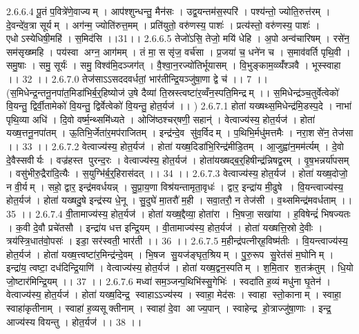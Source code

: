 2.6.6.4
पू॒तं प॒वित्रे॑णे॒वाज्यम् । आप॑श्शुन्धन्तु॒ मैन॑सः । उद्व॒यन्तम॑स॒स्परि॑ । पश्य॑न्तो॒ ज्योति॒रुत्त॑रम् । दे॒वन्दे॑व॒त्रा सूर्यम् । अग॑न्म॒ ज्योति॑रुत्त॒मम् । प्रति॑युतो॒ वरु॑णस्य॒ पाशः॑ । प्रत्य॑स्तो॒ वरु॑णस्य॒ पाशः॑ । एधोऽस्येधिषी॒महि॑ । स॒मिद॑सि ।।31।।
2.6.6.5
तेजो॑ऽसि॒ तेजो॒ मयि॑ धेहि । अ॒पो अन्व॑चारिषम् । रसे॑न॒ सम॑सृख्ष्महि । पय॑स्वा अग्न॒ आग॑मम् । तं मा॒ ससृ॑ज॒ वर्च॑सा । प्र॒जया॑ च॒ धने॑न च । स॒माव॑वर्ति पृथि॒वी । समु॒षाः । समु॒ सूर्यः॑ । समु॒ विश्व॑मि॒दञ्जग॑त् । वै॒श्वा॒न॒रज्यो॑तिर्भूयासम् । वि॒भुङ्काम॒व्व्यँ॑श्ञवै । भूस्स्वाहा ।। 32 ।।
2.6.7.0
तेज॑साऽऽसददवर्धतां॒ भार॑तीन्द्रि॒यञ्जु॑षा॒णा द्वे च॑ ।। 7 ।। (स॒मिधेन्द्र॒न्तनू॒नपा॑त॒मिडा॑भिर्ब॒र्॒हिष्योज॑ उ॒षे दैव्या॑ ति॒स्रस्त्वष्टा॑र॒व्वँन॒स्पति॒मिन्द्रम् ।। स॒मिधेन्द्र॑ञ्च॒तुर्वेत्वेको॑ वि॒यन्तु॒ द्विर्वी॒तामेको॑ वि॒यन्तु॒ द्विर्वेत्वेको॑ वि॒यन्तु॒ होत॒र्यज॑ ।। )
2.6.7.1
होता॑ यख्षथ्स॒मिधेन्द्र॑मि॒डस्प॒दे । नाभा॑ पृथि॒व्या अधि॑ । दि॒वो वर्ष्म॒न्थ्समि॑ध्यते । ओजि॑ष्ठश्चर्‌षणी॒ सहान्॑ । वेत्वाज्य॑स्य॒ होत॒र्यज॑ । होता॑ यख्ष॒त्तनू॒नपा॑तम् । ऊ॒तिभि॒र्जेता॑र॒मप॑राजितम् । इन्द्र॑न्दे॒व सु॑व॒र्विदम् । प॒थिभि॒र्मधु॑मत्तमैः । नरा॒शसे॑न॒ तेज॑सा ।। 33 ।।
2.6.7.2
वेत्वाज्य॑स्य॒ होत॒र्यज॑ । होता॑ यख्ष॒दिडा॑भि॒रिन्द्र॑मीडि॒तम् । आ॒जुह्वा॑न॒मम॑र्त्यम् । दे॒वो दे॒वैस्सवीर्यः । वज्र॑हस्त पुरन्द॒रः । वेत्वाज्य॑स्य॒ होत॒र्यज॑ । होता॑यख्षद्ब॒र्॒हिषीन्द्र॑न्निषद्व॒रम् । वृ॒ष॒भन्नर्या॑पसम् । वसु॑भीरु॒द्रैरा॑दि॒त्यैः । स॒युग्भि॑र्ब॒र्॒हिरास॑दत् ।। 34 ।।
2.6.7.3
वेत्वाज्य॑स्य॒ होत॒र्यज॑ । होता॑ यख्ष॒दोजो॒ न वी॒र्यम् । सहो॒ द्वार॒ इन्द्र॑मवर्धयन्न् । सु॒प्रा॒य॒णा विश्र॑यन्तामृता॒वृधः॑ । द्वार॒ इन्द्रा॑य मी॒ढुषे । वि॒यन्त्वाज्य॑स्य॒ होत॒र्यज॑ । होता॑ यख्षदु॒षे इन्द्र॑स्य धे॒नू । सु॒दुघे॑ मा॒तरौ॑ म॒ही । सवा॒तरौ॒ न तेज॑सी । व॒थ्समिन्द्र॑मवर्धताम् ।। 35 ।।
2.6.7.4
वी॒तामाज्य॑स्य॒ होत॒र्यज॑ । होता॑ यख्ष॒द्दैव्या॒ होता॑रा । भि॒षजा॒ सखा॑या । ह॒विषेन्द्रं॑ भिषज्यतः । क॒वी दे॒वौ प्रचे॑तसौ । इन्द्रा॑य धत्त इन्द्रि॒यम् । वी॒तामाज्य॑स्य॒ होत॒र्यज॑ । होता॑ यख्षत्ति॒स्रो दे॒वीः । त्रय॑स्त्रि॒धात॑वो॒पसः॑ । इडा॒ सर॑स्वती॒ भार॑ती ।। 36 ।।
2.6.7.5
म॒हीन्द्र॑पत्नीर्‌ह॒विष्म॑तीः । वि॒यन्त्वाज्य॑स्य॒ होत॒र्यज॑ । होता॑ यख्ष॒त्त्वष्टा॑र॒मिन्द्र॑न्दे॒वम् । भि॒षज॑ सु॒यज॑ङ्घृत॒श्रियम् । पु॒रु॒रूप॑ सु॒रेत॑सं म॒घोनिम् । इन्द्रा॑य॒ त्वष्टा॒ दध॑दिन्द्रि॒याणि॑ । वेत्वाज्य॑स्य॒ होत॒र्यज॑ । होता॑ यख्ष॒द्वन॒स्पतिम् । श॒मि॒तार॑ श॒तक्र॑तुम् । धि॒यो जो॒ष्टार॑मिन्द्रि॒यम् ।। 37 ।।
2.6.7.6
मध्वा॑ सम॒ञ्जन्प॒थिभि॑स्सु॒गेभिः॑ । स्वदा॑ति ह॒व्यं मधु॑ना घृ॒तेन॑ । वेत्वाज्य॑स्य॒ होत॒र्यज॑ । होता॑ यख्ष॒दिन्द्र॒॒ स्वाहाऽऽज्य॑स्य । स्वाहा॒ मेद॑सः । स्वाहा स्तो॒कानाम् । स्वाहा॒ स्वाहा॑कृतीनाम् । स्वाहा॑ ह॒व्यसूक्तीनाम् । स्वाहा॑ दे॒वा आज्य॒पान् । स्वाहेन्द्र॑ हो॒त्राज्जु॑षा॒णाः । इन्द्र॒ आज्य॑स्य वियन्तु । होत॒र्यज॑ ।। 38 ।।
